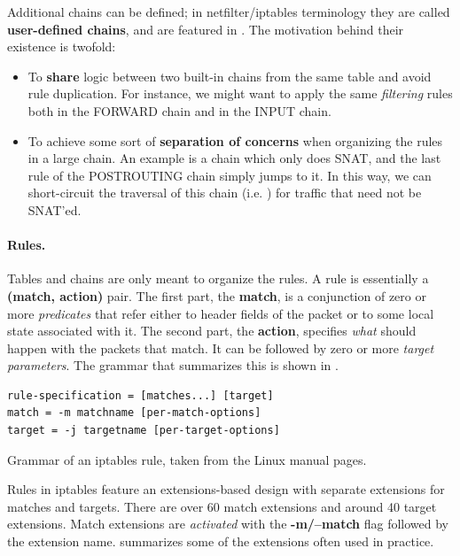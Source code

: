 Additional chains can be defined; in netfilter/iptables terminology they are
called \textbf{user-defined chains}, and are featured in
. The motivation behind their
existence is twofold:
\begin{itemize}
  \item To \textbf{share} logic between two built-in chains from the same table
    and avoid rule duplication.  For instance, we might want to apply the same
    \emph{filtering} rules both in the FORWARD chain and in the INPUT chain.
  \item To achieve some sort of \textbf{separation of concerns} when organizing
    the rules in a large chain. An example is a chain which only does SNAT, and
    the last rule of the POSTROUTING chain simply jumps to it.  In this way, we
    can short-circuit the traversal of this chain (i.e. )
    for traffic that need not be SNAT'ed.
\end{itemize}

\paragraph{Rules.}
Tables and chains are only meant to organize the rules.  A rule is essentially
a \textbf{(match, action)} pair.  The first part, the \textbf{match}, is a
conjunction of zero or more \emph{predicates} that refer either to header
fields of the packet or to some local state associated with it.  The second
part, the \textbf{action}, specifies \emph{what} should happen with the packets
that match.  It can be followed by zero or more \emph{target parameters}. The
grammar that summarizes this is shown in
.

\begin{listing}
  \lstset{numbers=none, frame=single, basicstyle=\ttfamily,
    xleftmargin=0.15\textwidth, xrightmargin=0.15\textwidth
  }
\begin{lstlisting}
rule-specification = [matches...] [target]
match = -m matchname [per-match-options]
target = -j targetname [per-target-options]
\end{lstlisting}
  \caption{Grammar of an iptables rule, taken from the Linux manual pages.}
  \label{lst:rule-grammar}
\end{listing}

Rules in iptables feature an extensions-based design with separate extensions
for matches and targets. There are over 60 match extensions and around 40
target extensions.  Match extensions are \emph{activated} with the
\textbf{-m/--match} flag followed by the extension name.
 summarizes some of the
extensions often used in practice.


